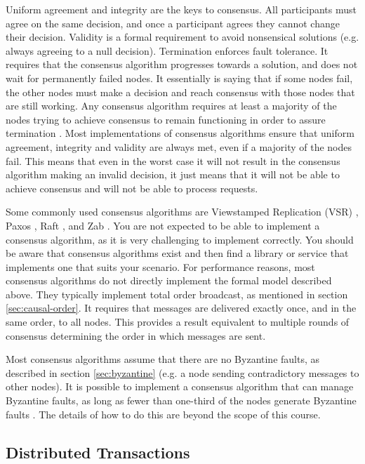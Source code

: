 Uniform agreement and integrity are the keys to consensus.
All participants must agree on the same decision, and once a participant agrees they cannot change their decision.
Validity is a formal requirement to avoid nonsensical solutions (e.g. always agreeing to a null decision).
Termination enforces fault tolerance.
It requires that the consensus algorithm progresses towards a solution, and does not wait for permanently failed nodes.
It essentially is saying that if some nodes fail,
the other nodes must make a decision and reach consensus with those nodes that are still working.
Any consensus algorithm requires at least a majority of the nodes trying to achieve consensus
to remain functioning in order to assure termination \cite{chandra1996reliable}.
Most implementations of consensus algorithms ensure that uniform agreement, integrity and validity are always met, 
even if a majority of the nodes fail.
This means that even in the worst case it will not result in the consensus algorithm making an invalid decision,
it just means that it will not be able to achieve consensus and will not be able to process requests.

Some commonly used consensus algorithms are Viewstamped Replication (VSR) \cite{vsr1988},
Paxos \cite{paxos1998}, Raft \cite{raft2015}, and Zab \cite{zab2011}.
You are not expected to be able to implement a consensus algorithm, as it is very challenging to implement correctly.
You should be aware that consensus algorithms exist and then find a library or service that implements one that suits your scenario.
For performance reasons, most consensus algorithms do not directly implement the formal model described above.
They typically implement total order broadcast, as mentioned in section \ref{sec:causal-order}.
It requires that messages are delivered exactly once, and in the same order, to all nodes.
This provides a result equivalent to multiple rounds of consensus determining the order in which messages are sent.

Most consensus algorithms assume that there are no Byzantine faults, as described in section \ref{sec:byzantine}
(e.g. a node sending contradictory messages to other nodes).
It is possible to implement a consensus algorithm that can manage Byzantine faults,
as long as fewer than one-third of the nodes generate Byzantine faults \cite{byzantine-tolerance-2002}.
The details of how to do this are beyond the scope of this course.

\subsection{Distributed Transactions}

